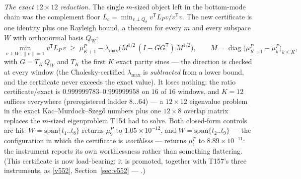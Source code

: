 \documentclass[11pt,a4paper]{article}
\begin{document}
\emph{The exact $12\times12$ reduction.} The single $m$-sized object left in the bottom-mode
chain was the complement floor $L_c=\min_{v\perp Q_8}v^{\mathsf T}L_Pv/v^{\mathsf T}v$. The
new certificate is one identity plus one Rayleigh bound, a theorem for every $m$ and every
subspace $W$ with orthonormal basis $Q_W$:
\[
\min_{v\perp W,\ \|v\|=1} v^{\mathsf T}L_P\,v \;\ge\;
\mu^P_{K+1}-\lambda_{\max}\!\bigl(M^{1/2}\,(I-GG^{\mathsf T})\,M^{1/2}\bigr),
\qquad
M=\operatorname{diag}\bigl(\mu^P_{K+1}-\mu^P_k\bigr)_{k\le K},
\]
with $G=T_K\,Q_W$ and $T_K$ the first $K$ exact parity sines --- the direction is checked at every window
(the Cholesky-certified $\lambda_{\max}$ is \emph{subtracted} from a lower bound, and the
certificate never exceeds the exact value). It loses nothing: the ratio certificate/exact
is $\mathbf{0.999999783}$--$\mathbf{0.999999958}$ on $16$ of $16$ windows, and $K=12$
suffices everywhere (preregistered ladder $8\ldots64$) --- a $12\times12$ eigenvalue
problem in the exact Kac--Murdock--Szeg\H{o} numbers plus one $12\times8$ overlap matrix
replaces the $m$-sized eigenproblem T154 had to solve. Both closed-form controls are hit:
$W=\mathrm{span}\{t_1..t_8\}$ returns $\mu^P_9$ to $1.05\times10^{-12}$, and
$W=\mathrm{span}\{t_2..t_9\}$ --- the configuration in which the certificate is
\emph{worthless} --- returns $\mu^P_1$ to $8.89\times10^{-11}$: the instrument reports its
own worthlessness rather than something flattering. (This certificate is now
load-bearing: it is promoted, together with T157's three instruments, as
\vref{v552}, Section~\ref{sec:v552} --- .)
\end{document}
